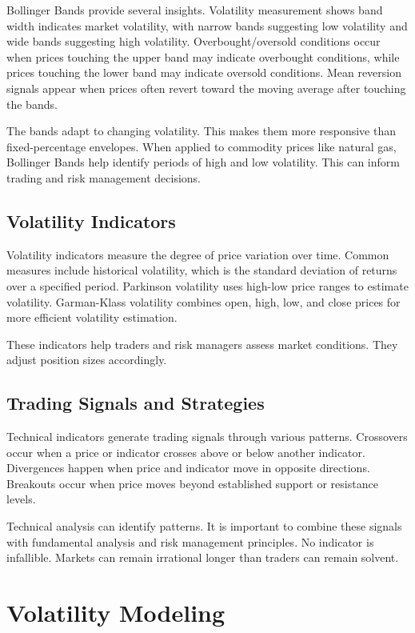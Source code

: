 Bollinger Bands provide several insights. Volatility measurement shows band width indicates market volatility, with narrow bands suggesting low volatility and wide bands suggesting high volatility. Overbought/oversold conditions occur when prices touching the upper band may indicate overbought conditions, while prices touching the lower band may indicate oversold conditions. Mean reversion signals appear when prices often revert toward the moving average after touching the bands.

The bands adapt to changing volatility. This makes them more responsive than fixed-percentage envelopes. When applied to commodity prices like natural gas, Bollinger Bands help identify periods of high and low volatility. This can inform trading and risk management decisions.

\subsection{Volatility Indicators}

Volatility indicators measure the degree of price variation over time. Common measures include historical volatility, which is the standard deviation of returns over a specified period. Parkinson volatility uses high-low price ranges to estimate volatility. Garman-Klass volatility combines open, high, low, and close prices for more efficient volatility estimation.

These indicators help traders and risk managers assess market conditions. They adjust position sizes accordingly.

\subsection{Trading Signals and Strategies}

Technical indicators generate trading signals through various patterns. Crossovers occur when a price or indicator crosses above or below another indicator. Divergences happen when price and indicator move in opposite directions. Breakouts occur when price moves beyond established support or resistance levels.

Technical analysis can identify patterns. It is important to combine these signals with fundamental analysis and risk management principles. No indicator is infallible. Markets can remain irrational longer than traders can remain solvent.

\section{Volatility Modeling}

